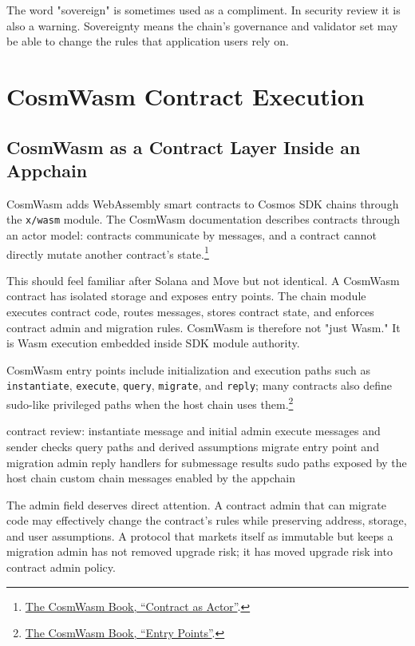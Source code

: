 The word "sovereign" is sometimes used as a compliment. In security review it is also a warning. Sovereignty means the chain's governance and validator set may be able to change the rules that application users rely on.

\section{CosmWasm Contract Execution}

\subsection{CosmWasm as a Contract Layer Inside an Appchain}

CosmWasm adds WebAssembly smart contracts to Cosmos SDK chains through the \texttt{x/wasm} module. The CosmWasm documentation describes contracts through an actor model: contracts communicate by messages, and a contract cannot directly mutate another contract's state.\footnote{\href{https://book.cosmwasm.com/actor-model/contract-as-actor.html}{The CosmWasm Book, ``Contract as Actor''}.}

This should feel familiar after Solana and Move but not identical. A CosmWasm contract has isolated storage and exposes entry points. The chain module executes contract code, routes messages, stores contract state, and enforces contract admin and migration rules. CosmWasm is therefore not "just Wasm." It is Wasm execution embedded inside SDK module authority.

CosmWasm entry points include initialization and execution paths such as \texttt{instantiate}, \texttt{execute}, \texttt{query}, \texttt{migrate}, and \texttt{reply}; many contracts also define sudo-like privileged paths when the host chain uses them.\footnote{\href{https://book.cosmwasm.com/basics/entry-points.html}{The CosmWasm Book, ``Entry Points''}.}

\begin{codeblock}
contract review:
    instantiate message and initial admin
    execute messages and sender checks
    query paths and derived assumptions
    migrate entry point and migration admin
    reply handlers for submessage results
    sudo paths exposed by the host chain
    custom chain messages enabled by the appchain
\end{codeblock}

The admin field deserves direct attention. A contract admin that can migrate code may effectively change the contract's rules while preserving address, storage, and user assumptions. A protocol that markets itself as immutable but keeps a migration admin has not removed upgrade risk; it has moved upgrade risk into contract admin policy.

